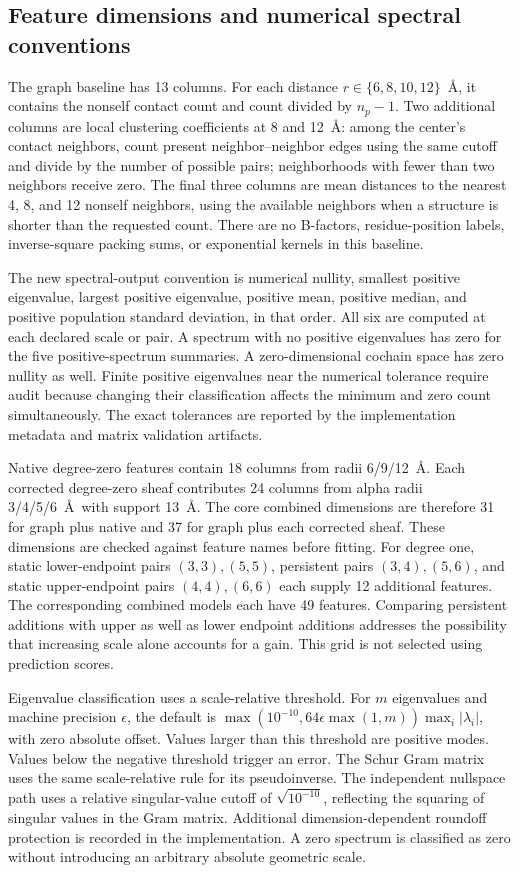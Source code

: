 \subsection{Feature dimensions and numerical spectral conventions}
\label{sec:feature_details}
The graph baseline has 13 columns. For each distance $r\in\{6,8,10,12\}$~\AA, it contains the nonself contact count and count divided by $n_p-1$. Two additional columns are local clustering coefficients at 8 and 12~\AA: among the center's contact neighbors, count present neighbor--neighbor edges using the same cutoff and divide by the number of possible pairs; neighborhoods with fewer than two neighbors receive zero. The final three columns are mean distances to the nearest 4, 8, and 12 nonself neighbors, using the available neighbors when a structure is shorter than the requested count. There are no B-factors, residue-position labels, inverse-square packing sums, or exponential kernels in this baseline.

The new spectral-output convention is numerical nullity, smallest positive eigenvalue, largest positive eigenvalue, positive mean, positive median, and positive population standard deviation, in that order. All six are computed at each declared scale or pair. A spectrum with no positive eigenvalues has zero for the five positive-spectrum summaries. A zero-dimensional cochain space has zero nullity as well. Finite positive eigenvalues near the numerical tolerance require audit because changing their classification affects the minimum and zero count simultaneously. The exact tolerances are reported by the implementation metadata and matrix validation artifacts.

Native degree-zero features contain 18 columns from radii 6/9/12~\AA. Each corrected degree-zero sheaf contributes 24 columns from alpha radii 3/4/5/6~\AA\ with support 13~\AA. The core combined dimensions are therefore 31 for graph plus native and 37 for graph plus each corrected sheaf. These dimensions are checked against feature names before fitting. For degree one, static lower-endpoint pairs $(3,3),(5,5)$, persistent pairs $(3,4),(5,6)$, and static upper-endpoint pairs $(4,4),(6,6)$ each supply 12 additional features. The corresponding combined models each have 49 features. Comparing persistent additions with upper as well as lower endpoint additions addresses the possibility that increasing scale alone accounts for a gain. This grid is not selected using prediction scores.

Eigenvalue classification uses a scale-relative threshold. For $m$ eigenvalues and machine precision $\epsilon$, the default is $\max(10^{-10},64\epsilon\max(1,m))\max_i|\lambda_i|$, with zero absolute offset. Values larger than this threshold are positive modes. Values below the negative threshold trigger an error. The Schur Gram matrix uses the same scale-relative rule for its pseudoinverse. The independent nullspace path uses a relative singular-value cutoff of $\sqrt{10^{-10}}$, reflecting the squaring of singular values in the Gram matrix. Additional dimension-dependent roundoff protection is recorded in the implementation. A zero spectrum is classified as zero without introducing an arbitrary absolute geometric scale.
